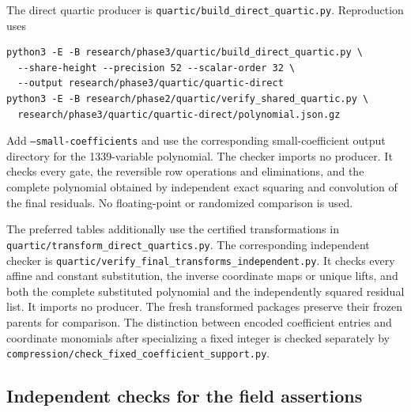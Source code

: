 The direct quartic producer is
\nolinkurl{quartic/build_direct_quartic.py}. Reproduction uses
\begin{verbatim}
python3 -E -B research/phase3/quartic/build_direct_quartic.py \
  --share-height --precision 52 --scalar-order 32 \
  --output research/phase3/quartic/quartic-direct
python3 -E -B research/phase2/quartic/verify_shared_quartic.py \
  research/phase3/quartic/quartic-direct/polynomial.json.gz
\end{verbatim}
Add \texttt{--small-coefficients} and use the corresponding
small-coefficient output directory for the 1339-variable polynomial.
The checker imports no producer. It checks every gate, the reversible
row operations and eliminations, and the complete polynomial obtained
by independent exact squaring and convolution of the final residuals.
No floating-point or randomized comparison is used.

The preferred tables additionally use the certified transformations in
\nolinkurl{quartic/transform_direct_quartics.py}. The corresponding
independent checker is
\nolinkurl{quartic/verify_final_transforms_independent.py}.
It checks every affine and constant substitution, the inverse coordinate
maps or unique lifts, and both the complete substituted polynomial and
the independently squared residual list. It imports no producer. The
fresh transformed packages preserve their frozen parents for comparison.
The distinction between encoded coefficient entries and coordinate
monomials after specializing a fixed integer is checked separately by
\nolinkurl{compression/check_fixed_coefficient_support.py}.

\subsection{Independent checks for the field assertions}

